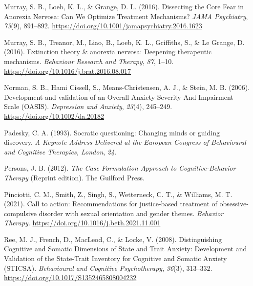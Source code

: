 \documentclass[
  man,floatsintext]{apa7}
\newlength{\cslhangindent}
\newlength{\cslentryspacingunit} %
\newenvironment{CSLReferences}[2] %
 {%
  \setlength{\parindent}{0pt}
  \ifodd #1
  \let\oldpar\par
  \def\par{\hangindent=\cslhangindent\oldpar}
  \fi
  \setlength{\parskip}{#2\cslentryspacingunit}
 }%
 {}
\begin{document}
\begin{CSLReferences}{1}{0}
\leavevmode{}%
Murray, S. B., Loeb, K. L., \& Grange, D. L. (2016). Dissecting the Core Fear in Anorexia Nervosa: Can We Optimize Treatment Mechanisms? \emph{JAMA Psychiatry}, \emph{73}(9), 891--892. \url{https://doi.org/10.1001/jamapsychiatry.2016.1623}

\leavevmode{}%
Murray, S. B., Treanor, M., Liao, B., Loeb, K. L., Griffiths, S., \& Le Grange, D. (2016). Extinction theory \& anorexia nervosa: Deepening therapeutic mechanisms. \emph{Behaviour Research and Therapy}, \emph{87}, 1--10. \url{https://doi.org/10.1016/j.brat.2016.08.017}

\leavevmode{}%
Norman, S. B., Hami Cissell, S., Means-Christensen, A. J., \& Stein, M. B. (2006). Development and validation of an Overall Anxiety Severity And Impairment Scale (OASIS). \emph{Depression and Anxiety}, \emph{23}(4), 245--249. \url{https://doi.org/10.1002/da.20182}

\leavevmode{}%
Padesky, C. A. (1993). Socratic questioning: Changing minds or guiding discovery. \emph{A Keynote Address Delivered at the European Congress of Behavioural and Cognitive Therapies, London}, \emph{24}.

\leavevmode{}%
Persons, J. B. (2012). \emph{The Case Formulation Approach to Cognitive-Behavior Therapy} (Reprint edition). The Guilford Press.

\leavevmode{}%
Pinciotti, C. M., Smith, Z., Singh, S., Wetterneck, C. T., \& Williams, M. T. (2021). Call to action: Recommendations for justice-based treatment of obsessive-compulsive disorder with sexual orientation and gender themes. \emph{Behavior Therapy}. \url{https://doi.org/10.1016/j.beth.2021.11.001}

\leavevmode{}%
Ree, M. J., French, D., MacLeod, C., \& Locke, V. (2008). Distinguishing Cognitive and Somatic Dimensions of State and Trait Anxiety: Development and Validation of the State-Trait Inventory for Cognitive and Somatic Anxiety (STICSA). \emph{Behavioural and Cognitive Psychotherapy}, \emph{36}(3), 313--332. \url{https://doi.org/10.1017/S1352465808004232}


\end{CSLReferences}
\end{document}
